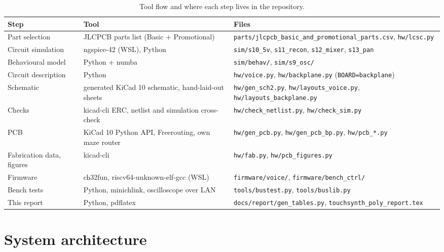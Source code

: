 \documentclass[11pt,a4paper]{article}
\newcommand{\file}[1]{\texttt{#1}}
\begin{document}
\begin{table}[htbp]
\centering\small
\caption{Tool flow and where each step lives in the repository.}\label{tab:tools}
\begin{tabularx}{\textwidth}{@{}>{\raggedright}p{3.0cm} >{\raggedright}p{4.0cm} >{\raggedright\arraybackslash}X@{}}
\toprule
Step & Tool & Files \\
\midrule
Part selection & JLCPCB parts list (Basic + Promotional) & \file{parts/jlcpcb\_basic\_and\_promotional\_parts.csv}, \file{hw/lcsc.py} \\
Circuit simulation & ngspice-42 (WSL), Python & \file{sim/s10\_5v}, \file{s11\_recon}, \file{s12\_mixer}, \file{s13\_pan} \\
Behavioural model & Python + numba & \file{sim/behav/}, \file{sim/s9\_osc/} \\
Circuit description & Python & \file{hw/voice.py}, \file{hw/backplane.py} (\texttt{BOARD=backplane}) \\
Schematic & generated KiCad 10 schematic, hand-laid-out sheets & \file{hw/gen\_sch2.py}, \file{hw/layouts\_voice.py}, \file{hw/layouts\_backplane.py} \\
Checks & kicad-cli ERC, netlist and simulation cross-check & \file{hw/check\_netlist.py}, \file{hw/check\_sim.py} \\
PCB & KiCad 10 Python API, Freerouting, own maze router & \file{hw/gen\_pcb.py}, \file{hw/gen\_pcb\_bp.py}, \file{hw/pcb\_*.py} \\
Fabrication data, figures & kicad-cli & \file{hw/fab.py}, \file{hw/pcb\_figures.py} \\
Firmware & ch32fun, riscv64-unknown-elf-gcc (WSL) & \file{firmware/voice/}, \file{firmware/bench\_ctrl/} \\
Bench tests & Python, minichlink, oscilloscope over LAN & \file{tools/bustest.py}, \file{tools/buslib.py} \\
This report & Python, pdflatex & \file{docs/report/gen\_tables.py}, \file{touchsynth\_poly\_report.tex} \\
\bottomrule
\end{tabularx}
\end{table}

\section{System architecture}\label{sec:arch}
\end{document}
